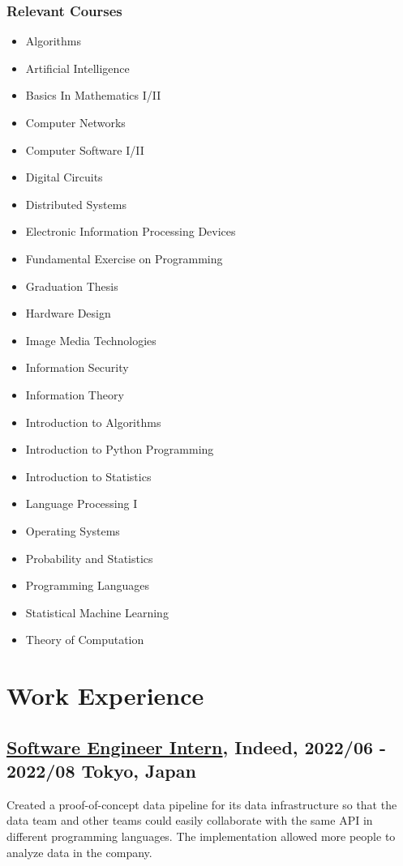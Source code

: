 \documentclass[10pt]{article}
\begin{document}
    \subsubsection*{Relevant Courses}
    \begin{multicols}{2}
      \begin{itemize}[noitemsep]
        \item Algorithms
        \item Artificial Intelligence
        \item Basics In Mathematics I/II
        \item Computer Networks
        \item Computer Software I/II
        \item Digital Circuits
        \item Distributed Systems
        \item Electronic Information Processing Devices
        \item Fundamental Exercise on Programming
        \item Graduation Thesis
        \item Hardware Design
        \item Image Media Technologies
        \item Information Security
        \item Information Theory
        \item Introduction to Algorithms
        \item Introduction to Python Programming
        \item Introduction to Statistics
        \item Language Processing I
        \item Operating Systems
        \item Probability and Statistics
        \item Programming Languages
        \item Statistical Machine Learning
        \item Theory of Computation
      \end{itemize}
    \end{multicols}

\section*{Work Experience}
  \subsection*{\underline{Software Engineer Intern}, Indeed, 2022/06 - 2022/08 \hfill Tokyo, Japan}
    Created a proof-of-concept data pipeline for its data infrastructure so that the data team and other teams could easily collaborate with the same API in different programming languages.
    The implementation allowed more people to analyze data in the company.
\end{document}
